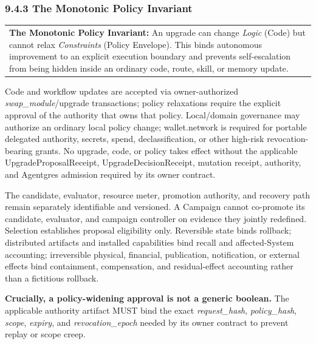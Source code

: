 \documentclass[
  11pt,
]{article}
\begin{document}
\hypertarget{the-monotonic-policy-invariant}{%
\subsubsection{9.4.3 The Monotonic Policy
Invariant}\label{the-monotonic-policy-invariant}}

\begin{longtable}[]{@{}>{\raggedright\arraybackslash}p{\linewidth}@{}}
\toprule\noalign{}
 \\
\midrule\noalign{}
\endhead
\bottomrule\noalign{}
\endlastfoot
\textbf{The Monotonic Policy Invariant:} An upgrade can change
\emph{Logic} (Code) but cannot relax \emph{Constraints} (Policy
Envelope). This binds autonomous improvement to an explicit execution
boundary and prevents self-escalation from being hidden inside an
ordinary code, route, skill, or memory update. \\
\end{longtable}

Code and workflow updates are accepted via owner-authorized
\emph{swap\_module}/upgrade transactions; policy relaxations require the
explicit approval of the authority that owns that policy. Local/domain
governance may authorize an ordinary local policy change; wallet.network is
required for portable delegated authority, secrets, spend, declassification,
or other high-risk revocation-bearing grants. No upgrade, code, or policy
takes effect without the applicable
UpgradeProposalReceipt, UpgradeDecisionReceipt, mutation receipt, authority,
and Agentgres admission required by its owner contract.

The candidate, evaluator, resource meter, promotion authority, and recovery
path remain separately identifiable and versioned. A Campaign cannot co-promote
its candidate, evaluator, and campaign controller on evidence they jointly
redefined. Selection establishes proposal eligibility only. Reversible state
binds rollback; distributed artifacts and installed capabilities bind recall
and affected-System accounting; irreversible physical, financial,
publication, notification, or external effects bind containment, compensation,
and residual-effect accounting rather than a fictitious rollback.

\textbf{Crucially, a policy-widening approval is not a generic boolean.}
The applicable authority artifact MUST bind the exact
\emph{request\_hash}, \emph{policy\_hash}, \emph{scope}, \emph{expiry},
and \emph{revocation\_epoch} needed by its owner contract to prevent replay
or scope creep.
\end{document}
